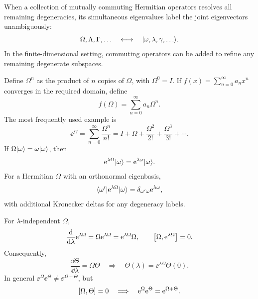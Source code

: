 When a collection of mutually commuting Hermitian operators resolves
all remaining degeneracies, its simultaneous eigenvalues label the
joint eigenvectors unambiguously:
\[
 \Omega,\Lambda,\Gamma,\ldots
 \quad\longleftrightarrow\quad
 \lvert \omega,\lambda,\gamma,\ldots\rangle.
\]
In the finite-dimensional setting, commuting operators can be added
to refine any remaining degenerate subspaces.

Define $\Omega^n$ as the product of $n$ copies of $\Omega$, with
$\Omega^0=I$. If $f(x)=\sum_{n=0}^{\infty}a_nx^n$ converges in the
required domain, define
\[
 f(\Omega)=\sum_{n=0}^{\infty}a_n\Omega^n.
\]
The most frequently used example is
\[
 \ee^{\Omega}=\sum_{n=0}^{\infty}\frac{\Omega^n}{n!}
 =I+\Omega+\frac{\Omega^2}{2!}+\frac{\Omega^3}{3!}+\cdots.
\]
If $\Omega\lvert \omega\rangle=\omega\lvert \omega\rangle$, then
\[
 \mathrm{e}^{\lambda\Omega}\lvert \omega\rangle=\mathrm{e}^{\lambda\omega}\lvert \omega\rangle.
\]
For a Hermitian $\Omega$ with an orthonormal eigenbasis,
\[
 \langle \omega'\rvert \mathrm{e}^{\lambda\Omega}\lvert \omega\rangle
 =\delta_{\omega'\omega}\mathrm{e}^{\lambda\omega},
\]
with additional Kronecker deltas for any degeneracy labels.

For $\lambda$-independent $\Omega$,
\[
 \frac{\mathop{}\!\mathrm{d}}{\mathop{}\!\mathrm{d}\lambda}\mathrm{e}^{\lambda\Omega}
 =\Omega\mathrm{e}^{\lambda\Omega}=\mathrm{e}^{\lambda\Omega}\Omega,
 \qquad \left[\Omega,\mathrm{e}^{\lambda\Omega}\right]=0.
\]
Consequently,
\[
 \frac{\dd\Theta}{\dd\lambda}=\Omega\Theta
 \quad\Longrightarrow\quad
 \Theta(\lambda)=\ee^{\lambda\Omega}\Theta(0).
\]
In general $\ee^{\Omega}\ee^{\Theta}\ne\ee^{\Omega+\Theta}$, but
\[
 \left[\Omega,\Theta\right]=0
 \quad\Longrightarrow\quad
 \mathrm{e}^{\Omega}\mathrm{e}^{\Theta}=\mathrm{e}^{\Omega+\Theta}.
\]
